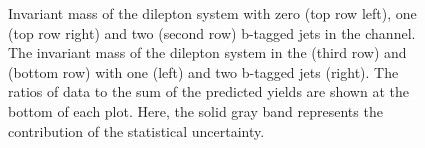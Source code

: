 \begin{figure}[htbp!]
\begin{center}

      \caption{Invariant mass of the dilepton system with zero (top row left), one (top row right) and two (second row) b-tagged 
      jets in the \emu channel. The invariant mass of the dilepton system in the \mumu (third row) and \ee (bottom row) with one (left)
      and two b-tagged jets (right).
        The ratios of data to the sum of the predicted yields are
        shown at the bottom of each plot. Here, the solid gray band
        represents the contribution of the statistical uncertainty.}  
       \label{fig:xsec_ctrplots_mll}
  \end{center}
\end{figure}






